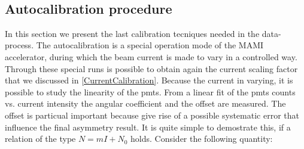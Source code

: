 \begin{figure}[h]
\centering
{}
\\
\end{figure}

\newpage
\subsection{Autocalibration procedure} \label{Autocalib}

In this section we present the last calibration tecniques needed in the data-process. The autocalibration is a special operation mode of the MAMI accelerator, during which the beam current is made to vary in a controlled way. Through these special runs is possible to obtain again the current scaling factor that we discussed in \ref{CurrentCalibration}. Because the current in varying, it is possible to study the linearity of the pmts. From a linear fit of the pmts counts vs. current intensity the angular coefficient and the offset are measured. The offset is particual important because give rise of a possible systematic error that influence the final asymmetry result. It is quite simple to demostrate this, if a relation of the type $N = mI + N_{0} $ holds. Consider the following quantity:

